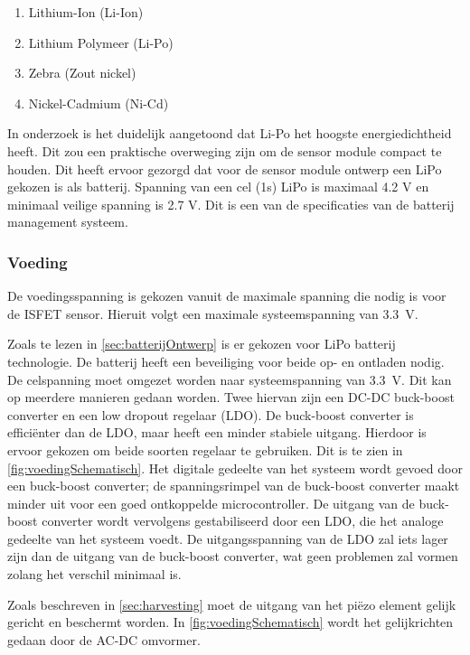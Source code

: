 \begin{enumerate}
    \item Lithium-Ion (Li-Ion)
    \item Lithium Polymeer (Li-Po)
    \item Zebra (Zout nickel) 
    \item Nickel-Cadmium (Ni-Cd)
\end{enumerate}

In onderzoek \cite{battery_comparison} is het duidelijk aangetoond dat Li-Po het hoogste energiedichtheid heeft. Dit zou een praktische overweging zijn om de sensor module compact te houden. Dit heeft ervoor gezorgd dat voor de sensor module ontwerp een LiPo gekozen is als batterij. Spanning van een cel (1s) LiPo is maximaal 4.2 V en minimaal veilige spanning is 2.7 V\cite{BatteryComparison}. Dit is een van de specificaties van de batterij management systeem. 


\subsubsection{Voeding} \label{sec:voeding}
De voedingsspanning is gekozen vanuit de maximale spanning die nodig is voor de ISFET sensor\cite{isfet}. Hieruit volgt een maximale systeemspanning van \qty{3.3}{\volt}.

Zoals te lezen in \cref{sec:batterijOntwerp} is er gekozen voor LiPo batterij technologie. De batterij heeft een beveiliging voor beide op- en ontladen nodig. De celspanning moet omgezet worden naar systeemspanning van \qty{3.3}{\volt}. Dit kan op meerdere manieren gedaan worden. Twee hiervan zijn een DC-DC buck-boost converter en een low dropout regelaar (LDO). De buck-boost converter is efficiënter dan de LDO, maar heeft een minder stabiele uitgang. Hierdoor is ervoor gekozen om beide soorten regelaar te gebruiken. Dit is te zien in \cref{fig:voedingSchematisch}. Het digitale gedeelte van het systeem wordt gevoed door een buck-boost converter; de spanningsrimpel van de buck-boost converter maakt minder uit voor een goed ontkoppelde microcontroller.
De uitgang van de buck-boost converter wordt vervolgens gestabiliseerd door een LDO, die het analoge gedeelte van het systeem voedt. De uitgangsspanning van de LDO zal iets lager zijn dan de uitgang van de buck-boost converter, wat geen problemen zal vormen zolang het verschil minimaal is.

Zoals beschreven in \cref{sec:harvesting} moet de uitgang van het piëzo element gelijk gericht en beschermt worden. In \cref{fig:voedingSchematisch} wordt het gelijkrichten gedaan door de AC-DC omvormer.

